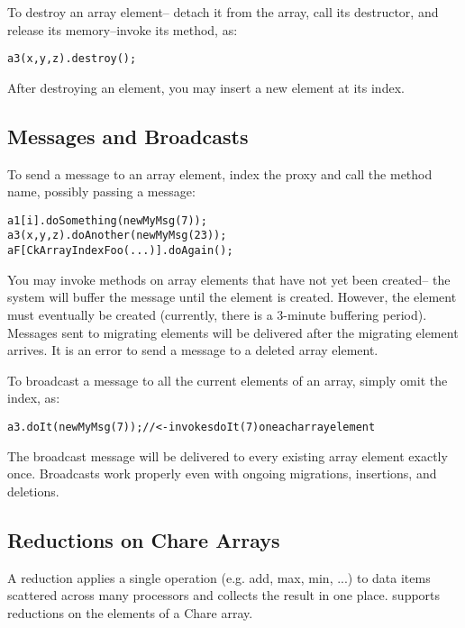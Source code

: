 To destroy an array element-- detach it from the array,
call its destructor, and release its memory--invoke its 
 method, as:

\begin{alltt}
a3(x,y,z).destroy();
\end{alltt}

After destroying an element, you may insert a new element at
its index.

\subsection{Messages and Broadcasts}

To send a  message to an array element, index the proxy 
and call the method name, possibly passing a message:

\begin{alltt}
a1[i].doSomething(new MyMsg(7));
a3(x,y,z).doAnother(new MyMsg(23));
aF[CkArrayIndexFoo(...)].doAgain();
\end{alltt}

You may invoke methods on array elements that have not yet
been created-- the system will buffer the message until the
element is created.  However, the element must eventually be 
created (currently, there is a 3-minute buffering period).
Messages sent to migrating elements will be delivered after
the migrating element arrives.  It is an error to send 
a message to a deleted array element.


To  broadcast a message to all the current elements of an array, 
simply omit the index, as:

\begin{alltt}
a3.doIt(new MyMsg(7)); //<- invokes doIt(7) on each array element
\end{alltt}

The broadcast message will be delivered to every existing array 
element exactly once.  Broadcasts work properly even with ongoing
migrations, insertions, and deletions.


\subsection{Reductions on Chare Arrays}
A reduction applies a single operation (e.g. add,
max, min, ...) to data items scattered across many processors and
collects the result in one place.  \charmpp{} supports reductions on the
elements of a Chare array.

